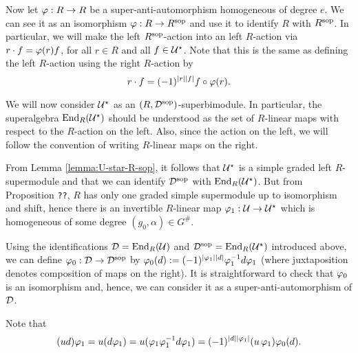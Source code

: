 \documentclass{amsbook}
\begin{document}

Now let $\varphi: R\to R$ be a super-anti-automorphism homogeneous of degree $e$.
We can see it as an isomorphism $\varphi: R\to R^{\mathrm{sop}}$ and use it to identify $R$ with $R^{\mathrm{sop}}$. In particular, we will make the left $R^{\mathrm{sop}}$-action into an left $R$-action via $r\cdot f = \varphi(r)f$, for all $r\in R$ and all $f\in \mathcal U^\star$. 
Note that this is the same as defining the left $R$-action using the right $R$-action by
%
\begin{equation}\label{eq:R-action-back-on-the-right}
    r\cdot f = (-1)^{|r||f|} f \circ \varphi(r) .
\end{equation}

We will now consider $\mathcal U^\star$ as an $(R,\mathcal{D}^{\mathrm{sop}})$-superbimodule. 
In particular, the superalgebra $\operatorname{End}_R(\mathcal U^\star)$ should be understood as the set of $R$-linear maps with respect to the $R$-action on the left. 
Also, since the action on the left, we will follow the convention of writing $R$-linear maps on the right.

From Lemma \ref{lemma:U-star-R-sop}, it follows that $\mathcal U^\star$ is a simple graded left $R$-supermodule and that we can identify $\mathcal{D}^{\mathrm{sop}}$ with $\operatorname{End}_R (\mathcal U^\star)$. 
But from Proposition {\tt ??}, $R$ has only one graded simple supermodule up to isomorphism and shift, hence there is an invertible $R$-linear map $\varphi_1: \mathcal U \to \mathcal U^\star$ which is homogeneous of some degree $(g_0, \alpha)\in G^\#$.

Using the identifications $\mathcal{D} = \operatorname{End}_R(\mathcal U)$ and $\mathcal{D}^{\mathrm{sop}} = \operatorname{End}_R(\mathcal U^\star)$ introduced above, we can define $\varphi_0: \mathcal{D} \to \mathcal{D}^{\mathrm{sop}}$ by $\varphi_0(d) := (-1)^{|\varphi_1||d|}\varphi_1^{-1} d \varphi_1$ (where juxtaposition denotes composition of maps on the right). It is straightforward to check that $\varphi_0$ is an isomorphism and, hence, we can consider it as a super-anti-automorphism of $\mathcal{D}$.

Note that
\begin{equation}\label{eq:sesquilinear-before-B}
    (ud)\varphi_1 = u (d\varphi_1) =  u(\varphi_1\varphi_1^{-1} d \varphi_1) = (-1)^{|d||\varphi_1|}(u\,\varphi_1 )\varphi_0(d).
\end{equation}
\end{document}
